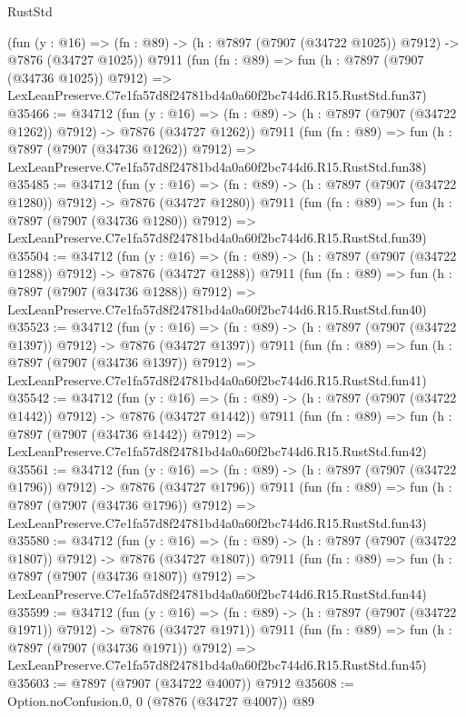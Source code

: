 \begin{lexlean}{RustStd}
\begin{coremodule}
    (fun (y : @16) =>
    (fn : @89) -> (h : @7897 (@7907 (@34722 @1025)) @7912) -> @7876 (@34727 @1025))
    @7911
    (fun (fn : @89) =>
    fun (h : @7897 (@7907 (@34736 @1025)) @7912) =>
    LexLeanPreserve.C7e1fa57d8f24781bd4a0a60f2bc744d6.R15.RustStd.fun37)
@35466 := @34712
    (fun (y : @16) =>
    (fn : @89) -> (h : @7897 (@7907 (@34722 @1262)) @7912) -> @7876 (@34727 @1262))
    @7911
    (fun (fn : @89) =>
    fun (h : @7897 (@7907 (@34736 @1262)) @7912) =>
    LexLeanPreserve.C7e1fa57d8f24781bd4a0a60f2bc744d6.R15.RustStd.fun38)
@35485 := @34712
    (fun (y : @16) =>
    (fn : @89) -> (h : @7897 (@7907 (@34722 @1280)) @7912) -> @7876 (@34727 @1280))
    @7911
    (fun (fn : @89) =>
    fun (h : @7897 (@7907 (@34736 @1280)) @7912) =>
    LexLeanPreserve.C7e1fa57d8f24781bd4a0a60f2bc744d6.R15.RustStd.fun39)
@35504 := @34712
    (fun (y : @16) =>
    (fn : @89) -> (h : @7897 (@7907 (@34722 @1288)) @7912) -> @7876 (@34727 @1288))
    @7911
    (fun (fn : @89) =>
    fun (h : @7897 (@7907 (@34736 @1288)) @7912) =>
    LexLeanPreserve.C7e1fa57d8f24781bd4a0a60f2bc744d6.R15.RustStd.fun40)
@35523 := @34712
    (fun (y : @16) =>
    (fn : @89) -> (h : @7897 (@7907 (@34722 @1397)) @7912) -> @7876 (@34727 @1397))
    @7911
    (fun (fn : @89) =>
    fun (h : @7897 (@7907 (@34736 @1397)) @7912) =>
    LexLeanPreserve.C7e1fa57d8f24781bd4a0a60f2bc744d6.R15.RustStd.fun41)
@35542 := @34712
    (fun (y : @16) =>
    (fn : @89) -> (h : @7897 (@7907 (@34722 @1442)) @7912) -> @7876 (@34727 @1442))
    @7911
    (fun (fn : @89) =>
    fun (h : @7897 (@7907 (@34736 @1442)) @7912) =>
    LexLeanPreserve.C7e1fa57d8f24781bd4a0a60f2bc744d6.R15.RustStd.fun42)
@35561 := @34712
    (fun (y : @16) =>
    (fn : @89) -> (h : @7897 (@7907 (@34722 @1796)) @7912) -> @7876 (@34727 @1796))
    @7911
    (fun (fn : @89) =>
    fun (h : @7897 (@7907 (@34736 @1796)) @7912) =>
    LexLeanPreserve.C7e1fa57d8f24781bd4a0a60f2bc744d6.R15.RustStd.fun43)
@35580 := @34712
    (fun (y : @16) =>
    (fn : @89) -> (h : @7897 (@7907 (@34722 @1807)) @7912) -> @7876 (@34727 @1807))
    @7911
    (fun (fn : @89) =>
    fun (h : @7897 (@7907 (@34736 @1807)) @7912) =>
    LexLeanPreserve.C7e1fa57d8f24781bd4a0a60f2bc744d6.R15.RustStd.fun44)
@35599 := @34712
    (fun (y : @16) =>
    (fn : @89) -> (h : @7897 (@7907 (@34722 @1971)) @7912) -> @7876 (@34727 @1971))
    @7911
    (fun (fn : @89) =>
    fun (h : @7897 (@7907 (@34736 @1971)) @7912) =>
    LexLeanPreserve.C7e1fa57d8f24781bd4a0a60f2bc744d6.R15.RustStd.fun45)
@35603 := @7897 (@7907 (@34722 @4007)) @7912
@35608 := Option.noConfusion.{0, 0} (@7876 (@34727 @4007)) @89

\end{coremodule}
\end{lexlean}
